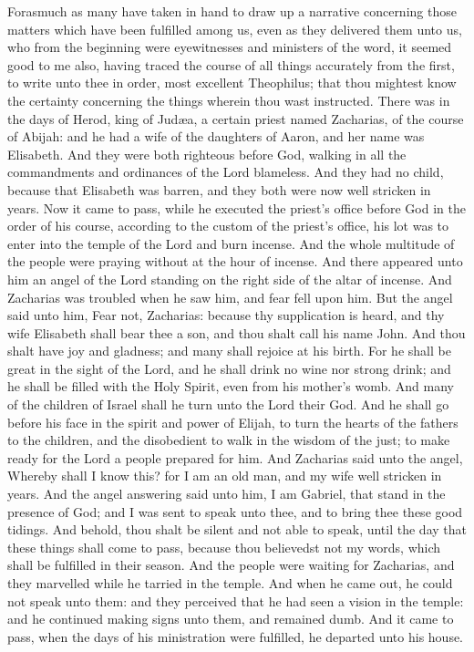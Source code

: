 


Forasmuch as many have taken in hand to draw up a narrative concerning those matters which have been fulfilled among us, even as they delivered them unto us, who from the beginning were eyewitnesses and ministers of the word, it seemed good to me also, having traced the course of all things accurately from the first, to write unto thee in order, most excellent Theophilus; that thou mightest know the certainty concerning the things wherein thou wast instructed.  There was in the days of Herod, king of Judæa, a certain priest named Zacharias, of the course of Abijah: and he had a wife of the daughters of Aaron, and her name was Elisabeth. And they were both righteous before God, walking in all the commandments and ordinances of the Lord blameless. And they had no child, because that Elisabeth was barren, and they both were now well stricken in years.  Now it came to pass, while he executed the priest’s office before God in the order of his course, according to the custom of the priest’s office, his lot was to enter into the temple of the Lord and burn incense. And the whole multitude of the people were praying without at the hour of incense. And there appeared unto him an angel of the Lord standing on the right side of the altar of incense. And Zacharias was troubled when he saw him, and fear fell upon him. But the angel said unto him, Fear not, Zacharias: because thy supplication is heard, and thy wife Elisabeth shall bear thee a son, and thou shalt call his name John. And thou shalt have joy and gladness; and many shall rejoice at his birth. For he shall be great in the sight of the Lord, and he shall drink no wine nor strong drink; and he shall be filled with the Holy Spirit, even from his mother’s womb. And many of the children of Israel shall he turn unto the Lord their God. And he shall go before his face in the spirit and power of Elijah, to turn the hearts of the fathers to the children, and the disobedient to walk in the wisdom of the just; to make ready for the Lord a people prepared for him. And Zacharias said unto the angel, Whereby shall I know this? for I am an old man, and my wife well stricken in years. And the angel answering said unto him, I am Gabriel, that stand in the presence of God; and I was sent to speak unto thee, and to bring thee these good tidings. And behold, thou shalt be silent and not able to speak, until the day that these things shall come to pass, because thou believedst not my words, which shall be fulfilled in their season. And the people were waiting for Zacharias, and they marvelled while he tarried in the temple. And when he came out, he could not speak unto them: and they perceived that he had seen a vision in the temple: and he continued making signs unto them, and remained dumb. And it came to pass, when the days of his ministration were fulfilled, he departed unto his house.  